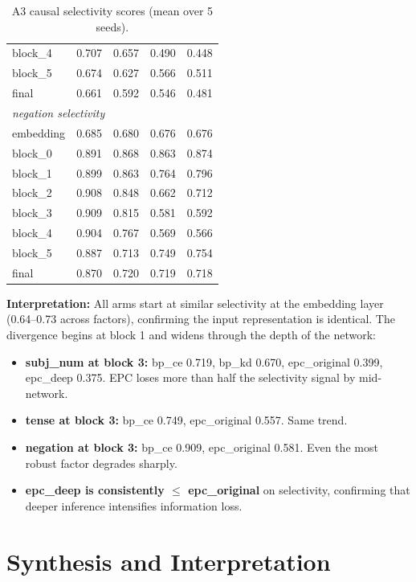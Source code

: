 \documentclass[11pt,a4paper]{article}
\begin{document}
\begin{table}[h]
\begin{tabular}{lrrrr}
block\_4 & 0.707 & 0.657 & 0.490 & 0.448 \\
block\_5 & 0.674 & 0.627 & 0.566 & 0.511 \\
final & 0.661 & 0.592 & 0.546 & 0.481 \\
\midrule
\multicolumn{5}{l}{\textit{negation selectivity}} \\
\midrule
embedding & 0.685 & 0.680 & 0.676 & 0.676 \\
block\_0 & 0.891 & 0.868 & 0.863 & 0.874 \\
block\_1 & 0.899 & 0.863 & 0.764 & 0.796 \\
block\_2 & 0.908 & 0.848 & 0.662 & 0.712 \\
block\_3 & 0.909 & 0.815 & 0.581 & 0.592 \\
block\_4 & 0.904 & 0.767 & 0.569 & 0.566 \\
block\_5 & 0.887 & 0.713 & 0.749 & 0.754 \\
final & 0.870 & 0.720 & 0.719 & 0.718 \\
\bottomrule
\end{tabular}
\caption{A3 causal selectivity scores (mean over 5 seeds).}
\label{tab:a3-selectivity}
\end{table}

\textbf{Interpretation:}
All arms start at similar selectivity at the embedding layer (0.64--0.73
across factors), confirming the input representation is identical.
The divergence begins at block 1 and widens through the depth of the
network:

\begin{itemize}[nosep]
  \item \textbf{subj\_num at block 3:} bp\_ce 0.719, bp\_kd 0.670,
    epc\_original 0.399, epc\_deep 0.375.  EPC loses more than half
    the selectivity signal by mid-network.
  \item \textbf{tense at block 3:} bp\_ce 0.749, epc\_original 0.557.
    Same trend.
  \item \textbf{negation at block 3:} bp\_ce 0.909, epc\_original
    0.581.  Even the most robust factor degrades sharply.
  \item \textbf{epc\_deep is consistently $\leq$ epc\_original} on
    selectivity, confirming that deeper inference intensifies
    information loss.
\end{itemize}

\section{Synthesis and Interpretation}
\end{document}

